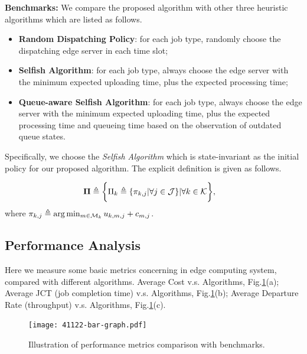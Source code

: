 \textbf{Benchmarks:}
We compare the proposed algorithm with other three heuristic algorithms which are listed as follows.
\begin{itemize}
    \item \textbf{Random Dispatching Policy}:
            for each job type, randomly choose the dispatching edge server in each time slot; 
    \item \textbf{Selfish Algorithm}:
            for each job type, always choose the edge server with the minimum expected uploading time, plus the expected processing time;
    \item \textbf{Queue-aware Selfish Algorithm}:
            for each job type, always choose the edge server with the minimum expected uploading time, plus the expected processing time and queueing time based on the observation of outdated queue states.
\end{itemize}
Specifically, we choose the \emph{Selfish Algorithm} which is state-invariant as the initial policy for our proposed algorithm.
The explicit definition is given as follows.
\begin{policy}
    \begin{align}
        \boldsymbol{\Pi} &\triangleq \bigg\{ \Pi_{k}\triangleq\{\pi_{k,j}|\forall j\in\mathcal{J}\} |\forall k\in\mathcal{K} \bigg\},
    \end{align}
    where $\pi_{k,j} \triangleq \arg\min_{m\in\mathcal{M}_{k}} u_{k,m,j} + c_{m,j}$.
\end{policy}

\subsection{Performance Analysis}
\label{subsec:basic}
Here we measure some basic metrics concerning in edge computing system, compared with different algorithms.
Average Cost v.s. Algorithms, Fig.\ref{fig:bar_plot}(a);
Average JCT (job completion time) v.s. Algorithms, Fig.\ref{fig:bar_plot}(b);
Average Departure Rate (throughput) v.s. Algorithms, Fig.\ref{fig:bar_plot}(c).

\begin{figure}[ht]                                                      %
    \centering                                                          %
    \texttt{[image: 41122-bar-graph.pdf]}         %
    \caption{Illustration of performance metrics comparison with benchmarks.}
    \label{fig:bar_plot}                                                %
\end{figure}                                                            %

